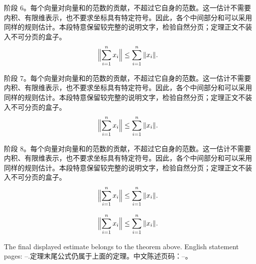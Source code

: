 \begin{pair}[\StatementKeepLines]
\begin{formaltheoremzh}{}
\ZHIndent 阶段 6。每个向量对向量和的范数的贡献，不超过它自身的范数。这一估计不需要内积、有限维表示，也不要求坐标具有特定符号。因此，各个中间部分和可以采用同样的规则估计。本段特意保留较完整的说明文字，检验自然分页；定理正文不装入不可分页的盒子。
\begin{equation*}\Bigl\|\sum_{i=1}^n x_i\Bigr\|\leq\sum_{i=1}^n\|x_i\|.\end{equation*}

\ZHIndent 阶段 7。每个向量对向量和的范数的贡献，不超过它自身的范数。这一估计不需要内积、有限维表示，也不要求坐标具有特定符号。因此，各个中间部分和可以采用同样的规则估计。本段特意保留较完整的说明文字，检验自然分页；定理正文不装入不可分页的盒子。
\begin{equation*}\Bigl\|\sum_{i=1}^n x_i\Bigr\|\leq\sum_{i=1}^n\|x_i\|.\end{equation*}

\ZHIndent 阶段 8。每个向量对向量和的范数的贡献，不超过它自身的范数。这一估计不需要内积、有限维表示，也不要求坐标具有特定符号。因此，各个中间部分和可以采用同样的规则估计。本段特意保留较完整的说明文字，检验自然分页；定理正文不装入不可分页的盒子。
\begin{equation*}\Bigl\|\sum_{i=1}^n x_i\Bigr\|\leq\sum_{i=1}^n\|x_i\|.\end{equation*}

\begin{equation*}\Bigl\|\sum_{i=1}^n x_i\Bigr\|\leq\sum_{i=1}^n\|x_i\|.\end{equation*}\label{cross:end:zh}
\end{formaltheoremzh}
\end{pair}
\begin{pair}\noindent The final displayed estimate belongs to the theorem above. English statement pages: \pageref*{cross:start:en}--\pageref*{cross:end:en}.\switchcolumn\noindent 定理末尾公式仍属于上面的定理。中文陈述页码：\pageref*{cross:start:zh}--\pageref*{cross:end:zh}。\end{pair}

